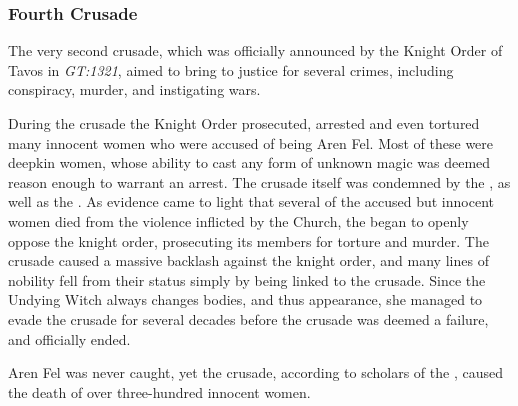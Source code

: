 \subsubsection{Fourth Crusade}
\label{sec:Fourth Crusade}

The very second crusade, which was officially announced by the Knight Order of
Tavos in \emph{GT:1321}, aimed to bring  to justice for
several crimes, including conspiracy, murder, and instigating wars.

During the crusade the Knight Order prosecuted, arrested and even tortured
many innocent women who were accused of being Aren Fel. Most of these were
deepkin women, whose ability to cast any form of unknown magic was deemed
reason enough to warrant an arrest. The crusade itself was condemned by the
, as well as the . As evidence came to light that several of the accused but innocent
women died from the violence inflicted by the Church, the  began to openly oppose the knight order, prosecuting its members for
torture and murder. The crusade caused a massive backlash against the knight
order, and many lines of nobility fell from their status simply by being
linked to the crusade. Since the Undying Witch always changes bodies, and thus
appearance, she managed to evade the crusade for several decades before the
crusade was deemed a failure, and officially ended.

Aren Fel was never caught, yet the crusade, according to scholars of the
, caused the death of over three-hundred innocent
women.
